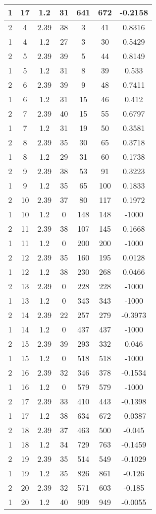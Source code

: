 \documentclass[letterpaper, 12pt]{article}
\begin{document}
\begin{longtable}{|c|c|c|c|c|c|c|}
\hline
1 & 17 & 1.2 & 31 & 641 & 672 & -0.2158 \\
\hline
2 & 4 & 2.39 & 38 & 3 & 41 & 0.8316 \\
\hline
1 & 4 & 1.2 & 27 & 3 & 30 & 0.5429 \\
\hline
2 & 5 & 2.39 & 39 & 5 & 44 & 0.8149 \\
\hline
1 & 5 & 1.2 & 31 & 8 & 39 & 0.533 \\
\hline
2 & 6 & 2.39 & 39 & 9 & 48 & 0.7411 \\
\hline
1 & 6 & 1.2 & 31 & 15 & 46 & 0.412 \\
\hline
2 & 7 & 2.39 & 40 & 15 & 55 & 0.6797 \\
\hline
1 & 7 & 1.2 & 31 & 19 & 50 & 0.3581 \\
\hline
2 & 8 & 2.39 & 35 & 30 & 65 & 0.3718 \\
\hline
1 & 8 & 1.2 & 29 & 31 & 60 & 0.1738 \\
\hline
2 & 9 & 2.39 & 38 & 53 & 91 & 0.3223 \\
\hline
1 & 9 & 1.2 & 35 & 65 & 100 & 0.1833 \\
\hline
2 & 10 & 2.39 & 37 & 80 & 117 & 0.1972 \\
\hline
1 & 10 & 1.2 & 0 & 148 & 148 & -1000 \\
\hline
2 & 11 & 2.39 & 38 & 107 & 145 & 0.1668 \\
\hline
1 & 11 & 1.2 & 0 & 200 & 200 & -1000 \\
\hline
2 & 12 & 2.39 & 35 & 160 & 195 & 0.0128 \\
\hline
1 & 12 & 1.2 & 38 & 230 & 268 & 0.0466 \\
\hline
2 & 13 & 2.39 & 0 & 228 & 228 & -1000 \\
\hline
1 & 13 & 1.2 & 0 & 343 & 343 & -1000 \\
\hline
2 & 14 & 2.39 & 22 & 257 & 279 & -0.3973 \\
\hline
1 & 14 & 1.2 & 0 & 437 & 437 & -1000 \\
\hline
2 & 15 & 2.39 & 39 & 293 & 332 & 0.046 \\
\hline
1 & 15 & 1.2 & 0 & 518 & 518 & -1000 \\
\hline
2 & 16 & 2.39 & 32 & 346 & 378 & -0.1534 \\
\hline
1 & 16 & 1.2 & 0 & 579 & 579 & -1000 \\
\hline
2 & 17 & 2.39 & 33 & 410 & 443 & -0.1398 \\
\hline
1 & 17 & 1.2 & 38 & 634 & 672 & -0.0387 \\
\hline
2 & 18 & 2.39 & 37 & 463 & 500 & -0.045 \\
\hline
1 & 18 & 1.2 & 34 & 729 & 763 & -0.1459 \\
\hline
2 & 19 & 2.39 & 35 & 514 & 549 & -0.1029 \\
\hline
1 & 19 & 1.2 & 35 & 826 & 861 & -0.126 \\
\hline
2 & 20 & 2.39 & 32 & 571 & 603 & -0.185 \\
\hline
1 & 20 & 1.2 & 40 & 909 & 949 & -0.0055 \\
\hline
\end{longtable}
\end{document}
